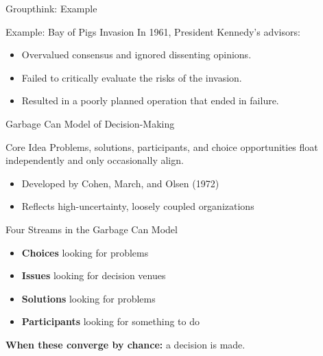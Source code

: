 \documentclass[10pt]{beamer}
\begin{document}
\begin{frame}{Groupthink: Example}
\begin{block}{Example: Bay of Pigs Invasion}
In 1961, President Kennedy's advisors:
\begin{itemize}
  \item Overvalued consensus and ignored dissenting opinions.
  \item Failed to critically evaluate the risks of the invasion.
  \item Resulted in a poorly planned operation that ended in failure.
\end{itemize}
\end{block}
\end{frame} 

\begin{frame}{Garbage Can Model of Decision-Making}
\begin{block}{Core Idea}
Problems, solutions, participants, and choice opportunities float independently and only occasionally align.
\end{block}
\begin{itemize}
  \item Developed by Cohen, March, and Olsen (1972)
  \item Reflects high-uncertainty, loosely coupled organizations
\end{itemize}
\end{frame}

\begin{frame}{Four Streams in the Garbage Can Model}
\begin{itemize}
  \item \textbf{Choices} looking for problems
  \item \textbf{Issues} looking for decision venues
  \item \textbf{Solutions} looking for problems
  \item \textbf{Participants} looking for something to do
\end{itemize}
\textbf{When these converge by chance:} a decision is made.
\end{frame}

\newcommand{\smoothstream}[4]{%
  \draw[streamarrow]
    (#1.east)
      .. controls ($(#1.east)+(0.90, #3)$) and ($(#2)+(-1.30, #4)$)
      .. (#2);
}
\end{document}
